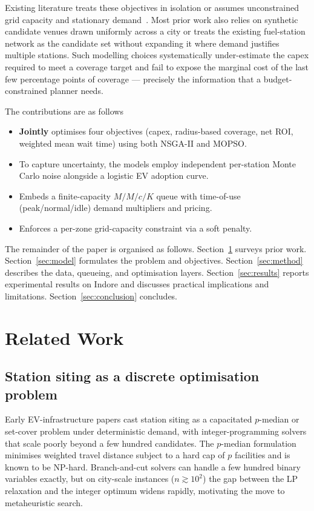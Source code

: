 \documentclass[conference]{IEEEtran}
\begin{document}
Existing literature treats these objectives in isolation or assumes
unconstrained grid capacity and stationary
demand~\cite{ref_ev_planning_review,ref_metaheuristic_ev}.
Most prior work also relies on synthetic candidate venues drawn
uniformly across a city or treats the existing fuel-station network
as the candidate set without expanding it where demand justifies
multiple stations. Such modelling choices systematically
under-estimate the capex required to meet a coverage target and
fail to expose the marginal cost of the last few percentage points
of coverage --- precisely the information that a budget-constrained
planner needs.

The contributions are as follows 
\begin{itemize}
\item \textbf{Jointly} optimises four objectives (capex, radius-based
      coverage, net ROI, weighted mean wait time) using both NSGA-II and
      MOPSO.
\item To capture uncertainty, the models employ independent per-station Monte Carlo noise alongside a logistic EV adoption curve.
\item Embeds a finite-capacity $M/M/c/K$ queue with time-of-use
      (peak/normal/idle) demand multipliers and pricing.
\item Enforces a per-zone grid-capacity constraint via a soft penalty.
\
\end{itemize}

The remainder of the paper is organised as follows.
Section~\ref{sec:related} surveys prior work. Section~\ref{sec:model}
formulates the problem and objectives. Section~\ref{sec:method} describes
the data, queueing, and optimisation layers. Section~\ref{sec:results}
reports experimental results on Indore and discusses practical
implications and limitations.
Section~\ref{sec:conclusion} concludes.

\section{Related Work}
\label{sec:related}

\subsection{Station siting as a discrete optimisation problem}
Early EV-infrastructure papers cast station siting as a capacitated
$p$-median or set-cover problem under deterministic demand, with
integer-programming solvers that scale poorly beyond a few hundred
candidates. The $p$-median formulation
minimises weighted travel distance subject to a hard cap of $p$
facilities and is known to be NP-hard. Branch-and-cut solvers can
handle a few hundred binary variables exactly, but on city-scale
instances ($n\!\gtrsim\!10^{2}$) the gap between the LP relaxation
and the integer optimum widens rapidly, motivating the move to
metaheuristic search.
\end{document}
